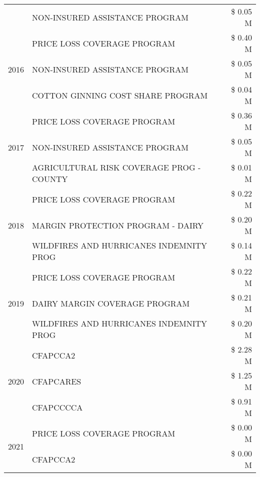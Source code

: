 \begin{tabular}{llr}
 & NON-INSURED ASSISTANCE PROGRAM & \$ 0.05 M \\
\cline{1-3}
\multirow[t]{3}{*}{2016} & PRICE LOSS COVERAGE PROGRAM                   & \$ 0.40 M \\
 & NON-INSURED ASSISTANCE PROGRAM                & \$ 0.05 M \\
 & COTTON GINNING COST SHARE PROGRAM             & \$ 0.04 M \\
\cline{1-3}
\multirow[t]{3}{*}{2017} & PRICE LOSS COVERAGE PROGRAM & \$ 0.36 M \\
 & NON-INSURED ASSISTANCE PROGRAM & \$ 0.05 M \\
 & AGRICULTURAL RISK COVERAGE PROG - COUNTY & \$ 0.01 M \\
\cline{1-3}
\multirow[t]{3}{*}{2018} & PRICE LOSS COVERAGE PROGRAM & \$ 0.22 M \\
 & MARGIN PROTECTION PROGRAM - DAIRY & \$ 0.20 M \\
 & WILDFIRES AND HURRICANES INDEMNITY PROG & \$ 0.14 M \\
\cline{1-3}
\multirow[t]{3}{*}{2019} & PRICE LOSS COVERAGE PROGRAM & \$ 0.22 M \\
 & DAIRY MARGIN COVERAGE PROGRAM & \$ 0.21 M \\
 & WILDFIRES AND HURRICANES INDEMNITY PROG & \$ 0.20 M \\
\cline{1-3}
\multirow[t]{3}{*}{2020} & CFAPCCA2 & \$ 2.28 M \\
 & CFAPCARES & \$ 1.25 M \\
 & CFAPCCCCA & \$ 0.91 M \\
\cline{1-3}
\multirow[t]{2}{*}{2021} & PRICE LOSS COVERAGE PROGRAM & \$ 0.00 M \\
 & CFAPCCA2 & \$ 0.00 M \\
\cline{1-3}
\bottomrule
\end{tabular}
